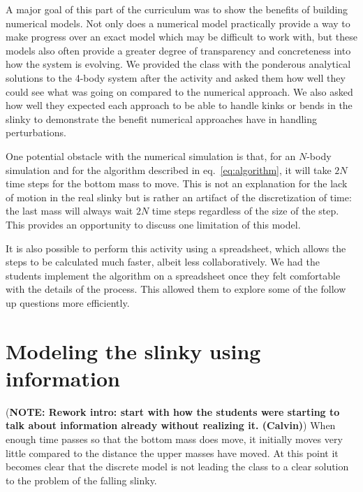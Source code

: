 \documentclass[prb,preprint,superscriptaddress]{revtex4-1}
\newcommand{\NOTE}[1]{\marginpar{\footnotesize\textbf{NOTE}} (\textbf{NOTE: #1})}
\newcommand{\eq}[1]{eq.~\eqref{eq:#1}}
\begin{document}
A major goal of this part of the curriculum was to show the benefits of building
numerical models. Not only does a numerical model
practically provide a way to make progress over an exact model which may be difficult
to work with, but these models also often provide a greater degree of transparency and
concreteness into how the system is evolving. We provided the class with the
ponderous analytical solutions to the 4-body system after the activity and asked
them how well they could see what was going on compared to the numerical
approach. We also asked how well they expected each approach to be able to
handle kinks or bends in the slinky to demonstrate the benefit numerical
approaches have in handling perturbations.

One potential obstacle with the numerical simulation is that, for an $N$-body simulation and for the algorithm described in \eq{algorithm},
it will take $2N$ time steps for the bottom mass to move. This is not an explanation for
the lack of motion in the real slinky but is rather an artifact of the discretization of time:
the last mass will always wait $2N$ time steps regardless of the size of the step.
This provides an opportunity to discuss one limitation of this model.

It is also possible to perform this activity using a spreadsheet, which allows the steps to be
calculated much faster, albeit less collaboratively. We had the students implement the algorithm on a spreadsheet once they
felt comfortable with the details of the process. This allowed them to explore some of the follow
up questions more efficiently.

\section{Modeling the slinky using information}
\label{sec:information}

\NOTE{Rework intro: start with how the students were starting to talk about information already without realizing it. (Calvin)}
When enough time passes so that the bottom mass does move, it initially moves very little compared 
to the distance the upper masses have moved. At this point it becomes clear that the discrete model
is not leading the class to a clear solution to the problem of the falling slinky.
\end{document}
